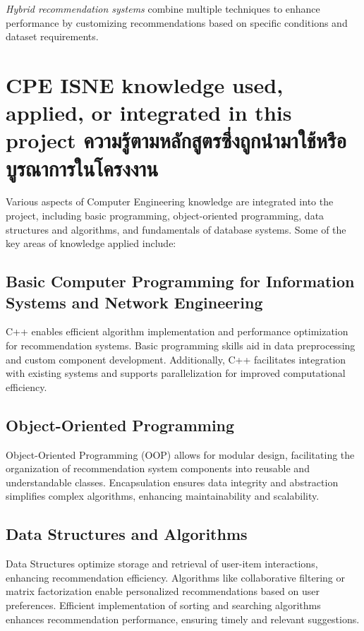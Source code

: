 \textit{Hybrid recommendation systems} combine multiple techniques to enhance performance 
by customizing recommendations based on specific conditions and dataset requirements.

\section{\ifenglish%
\ifcpe CPE \else ISNE \fi knowledge used, applied, or integrated in this project
\else%
ความรู้ตามหลักสูตรซึ่งถูกนำมาใช้หรือบูรณาการในโครงงาน
\fi
}

Various aspects of Computer Engineering knowledge are integrated into the project, including basic programming, object-oriented programming, data structures and algorithms, and fundamentals of database systems.
Some of the key areas of knowledge applied include:

\subsection{Basic Computer Programming for Information Systems and Network Engineering}

C++ enables efficient algorithm implementation and performance optimization for 
recommendation systems. Basic programming skills aid in data preprocessing and custom 
component development. Additionally, C++ facilitates integration with existing systems 
and supports parallelization for improved computational efficiency.

\subsection{Object-Oriented Programming}

Object-Oriented Programming (OOP) allows for modular design, facilitating the organization 
of recommendation system components into reusable and understandable classes. 
Encapsulation ensures data integrity and abstraction simplifies complex algorithms, 
enhancing maintainability and scalability.

\subsection{Data Structures and Algorithms}

Data Structures optimize storage and retrieval of user-item interactions, enhancing 
recommendation efficiency. Algorithms like collaborative filtering or matrix factorization 
enable personalized recommendations based on user preferences. Efficient implementation of 
sorting and searching algorithms enhances recommendation performance, ensuring timely and 
relevant suggestions.

